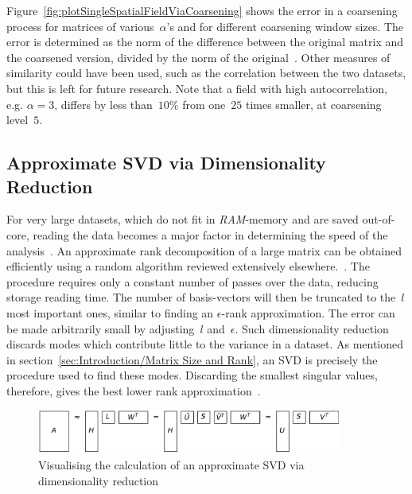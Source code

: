 \documentclass[ijgi,article,submit,moreauthors,pdftex,10pt,a4paper]{Definitions/mdpi}
\begin{document}
Figure~\ref{fig:plotSingleSpatialFieldViaCoarsening} shows the error in a coarsening process for matrices of various~$\alpha$'s and for different coarsening window sizes. The error is determined as the norm of the difference between the original matrix and the coarsened version, divided by the norm of the original~\cite{Bogaardt2018}. Other measures of similarity could have been used, such as the correlation between the two datasets, but this is left for future research. Note that a field with high autocorrelation, e.g. $\alpha=3$, differs by less than~$10\%$ from one~$25$ times smaller, at coarsening level~$5$.

\subsection{Approximate SVD via Dimensionality Reduction}
\label{sec:Results/Approximate SVD via Dimensionality Reduction}

For very large datasets, which do not fit in \textit{RAM}-memory and are saved out-of-core, reading the data becomes a major factor in determining the speed of the analysis~\cite{Halko2011}. An approximate rank decomposition of a large matrix can be obtained efficiently using a random algorithm reviewed extensively elsewhere.~\cite{Halko2011, Li2016}. The procedure requires only a constant number of passes over the data, reducing storage reading time. The number of basis-vectors will then be truncated to the~$l$ most important ones, similar to finding an $\epsilon$-rank approximation. The error can be made arbitrarily small by adjusting~$l$ and~$\epsilon$. Such dimensionality reduction discards modes which contribute little to the variance in a dataset. As mentioned in section~\ref{sec:Introduction/Matrix Size and Rank}, an SVD is precisely the procedure used to find these modes. Discarding the smallest singular values, therefore, gives the best lower rank approximation~\cite{Eckart1936, Martinsson2016}.

\begin{figure}[H]
\centering
\includegraphics[width=100mm]{Results/reduceSizeRandomisedSquare.pdf}
\caption[Approximate randomised SVD]{Visualising the calculation of an approximate SVD via dimensionality reduction}
\label{fig:reduceSizeRandomisedSquare}
\end{figure}
\end{document}
